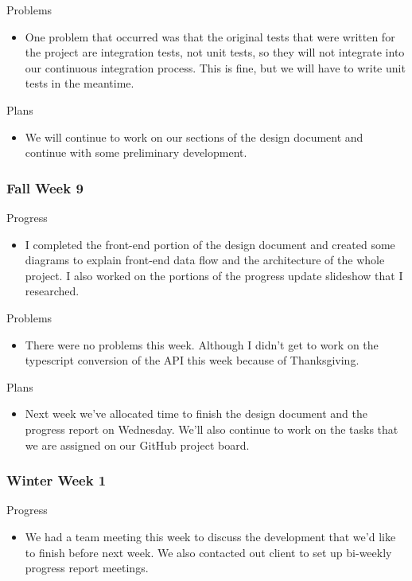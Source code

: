         \noindent
        Problems
        \begin{itemize}
            \item One problem that occurred was that the original tests that were written for the project are integration tests, not unit tests, so they will not integrate into our continuous integration process. This is fine, but we will have to write unit tests in the meantime.
        \end{itemize}
        
        \noindent
        Plans
        \begin{itemize}
            \item We will continue to work on our sections of the design document and continue with some preliminary development. 
        \end{itemize}
    \subsubsection{Fall Week 9}
        \noindent
        Progress
        \begin{itemize}
            \item I completed the front-end portion of the design document and created some diagrams to explain front-end data flow and the architecture of the whole project. I also worked on the portions of the progress update slideshow that I researched.
        \end{itemize}
        
        \noindent
        Problems
        \begin{itemize}
            \item There were no problems this week. Although I didn’t get to work on the typescript conversion of the API this week because of Thanksgiving. 
        \end{itemize}
        
        \noindent
        Plans
        \begin{itemize}
            \item Next week we’ve allocated time to finish the design document and the progress report on Wednesday. We’ll also continue to work on the tasks that we are assigned on our GitHub project board.
        \end{itemize}
    \subsubsection{Winter Week 1}
        \noindent
        Progress
        \begin{itemize}
            \item We had a team meeting this week to discuss the development that we'd like to finish before next week. We also contacted out client to set up bi-weekly progress report meetings.
        \end{itemize}
        
